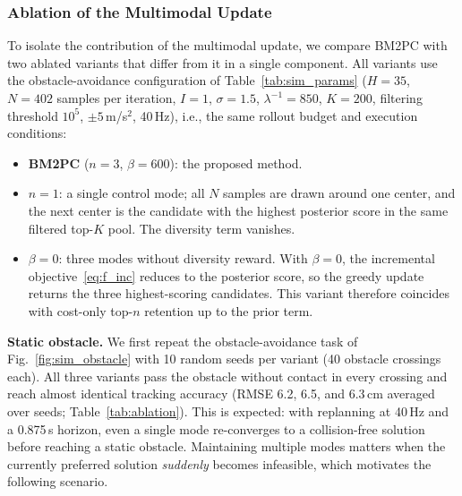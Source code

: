 
\subsubsection{Ablation of the Multimodal Update}
\label{sec:ablation}

To isolate the contribution of the multimodal update, we compare BM2PC with two ablated variants that differ from it in a single component. All variants use the obstacle-avoidance configuration of Table~\ref{tab:sim_params} ($H=35$, $N=402$ samples per iteration, $I=1$, $\sigma=1.5$, $\lambda^{-1}=850$, $K=200$, filtering threshold $10^5$, $\pm 5$\,m/s$^2$, 40\,Hz), i.e., the same rollout budget and execution conditions:
\begin{itemize}
\item \textbf{BM2PC} ($n=3$, $\beta=600$): the proposed method.
\item \textbf{$n=1$}: a single control mode; all $N$ samples are drawn around one center, and the next center is the candidate with the highest posterior score in the same filtered top-$K$ pool. The diversity term vanishes.
\item \textbf{$\beta=0$}: three modes without diversity reward. With $\beta=0$, the incremental objective~\eqref{eq:f_inc} reduces to the posterior score, so the greedy update returns the three highest-scoring candidates. This variant therefore coincides with cost-only top-$n$ retention up to the prior term.
\end{itemize}

\textbf{Static obstacle.} We first repeat the obstacle-avoidance task of Fig.~\ref{fig:sim_obstacle} with 10 random seeds per variant (40 obstacle crossings each). All three variants pass the obstacle without contact in every crossing and reach almost identical tracking accuracy (RMSE 6.2, 6.5, and 6.3\,cm averaged over seeds; Table~\ref{tab:ablation}). This is expected: with replanning at 40\,Hz and a 0.875\,s horizon, even a single mode re-converges to a collision-free solution before reaching a static obstacle. Maintaining multiple modes matters when the currently preferred solution \emph{suddenly} becomes infeasible, which motivates the following scenario.

